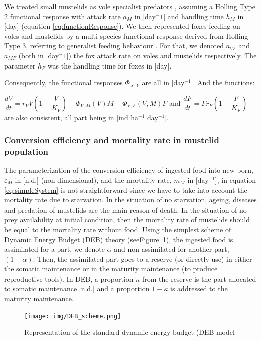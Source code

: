 \documentclass[11pt]{article}
\begin{document}
We treated small mustelids as vole specialist predators \citep{King2006}, assuming a Holling Type 2 functional response with attack rate $a_M$ in [day$^-1$] and handling time $h_M$ in [day] (equation \eqref{eq:functionResponse}). We then represented foxes feeding on voles and mustelids by a multi-species functional response derived from Holling Type 3, referring to generalist feeding behaviour \citep{Baudrot2016}. For that, we denoted $a_{VF}$ and $a_{MF}$ (both in  [day$^-1$]) the fox attack rate on voles and mustelids respectively. The parameter $h_F$ was the handling time for foxes in [day].

Consequently, the functional responses $\Phi_{X,Y}$ are all in [day$^{-1}$].  And the functions:
 
$\dfrac{dV}{dt}  =  r_V V \left( 1- \dfrac{V}{K_V}\right) - \Phi_{V,M}(V)M - \Phi_{V,F}(V,M)F$ and $\dfrac{dF}{dt} = F r_F \left( 1- \dfrac{F}{K_F}\right)$ are also consistent, all part being in [ind ha$^{-1}$ day$^{-1}$].


\subsubsection{Conversion efficiency and mortality rate in mustelid population}

The parameterization of the conversion efficiency of ingested food into new born, $\varepsilon_M$ in [n.d.] (non dimensional), and the mortality rate, $m_M$ in [day$^{-1}$], in equation \eqref{eq:simpleSystem} is not straightforward since we have to take into account the mortality rate due to starvation.
% 
In the situation of no starvation, ageing, diseases and predation of mustelids are the main reason of death. In the situation of no prey availability at initial condition, then the mortality rate of mustelids should be equal to the mortality rate without food. 
Using the simplest scheme of Dynamic Energy Budget (DEB) theory (seeFigure~\ref{fig:DEB_scheme}), the ingested food is assimilated for a part, we denote $\alpha$ and non-assimilated for another part, $(1- \alpha)$. Then, the assimilated part goes to a reserve (or directly use) in either the somatic maintenance or in the maturity maintenance (to produce reproductive tools). In DEB, a proportion $\kappa$ from the reserve is the part allocated to somatic maintenance [n.d.] and a proportion $1-\kappa$ is addressed to the maturity maintenance.


\begin{figure}
	\begin{center}
		\texttt{[image: img/DEB\_scheme.png]}
		\caption{Representation of the standard dynamic energy budget (DEB model \citep{Sousa2010}}
		\label{fig:DEB_scheme}
	\end{center}
\end{figure}
\end{document}

